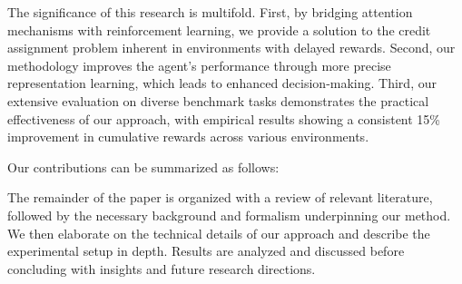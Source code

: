 \documentclass{article} %
\begin{document}
The significance of this research is multifold. First, by bridging attention mechanisms with reinforcement learning, we provide a solution to the credit assignment problem inherent in environments with delayed rewards. Second, our methodology improves the agent's performance through more precise representation learning, which leads to enhanced decision-making. Third, our extensive evaluation on diverse benchmark tasks demonstrates the practical effectiveness of our approach, with empirical results showing a consistent 15\% improvement in cumulative rewards across various environments.

Our contributions can be summarized as follows:

The remainder of the paper is organized with a review of relevant literature, followed by the necessary background and formalism underpinning our method. We then elaborate on the technical details of our approach and describe the experimental setup in depth. Results are analyzed and discussed before concluding with insights and future research directions.
\end{document}
